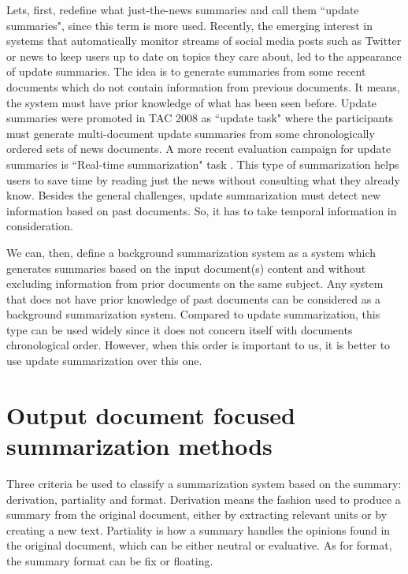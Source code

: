 Lets, first, redefine what just-the-news summaries and call them ``update summaries", since this term is more used. 
Recently, the emerging interest in systems that automatically monitor streams of social media posts such as Twitter or news to keep users up to date on topics they care about, led to the appearance of update summaries.
The idea is to generate summaries from some recent documents which do not contain information from previous documents. 
It means, the system must have prior knowledge of what has been seen before. 
Update summaries were promoted in TAC 2008 as ``update task" \citep{08-dang-owczarzak} where the participants must generate multi-document update summaries from some chronologically ordered sets of news documents.
A more recent evaluation campaign for update summaries is ``Real-time summarization" task \citep{17-lin-al}.
This type of summarization helps users to save time by reading just the news without consulting what they already know. 
Besides the general challenges, update summarization must detect new information based on past documents. 
So, it has to take temporal information in consideration. 

We can, then, define a background summarization system as a system which generates summaries based on the input document(s) content and without excluding information from prior documents on the same subject. 
Any system that does not have prior knowledge of past documents can be considered as a background summarization system. 
Compared to update summarization, this type can be used widely since it does not concern itself with documents chronological order.
However, when this order is important to us, it is better to use update summarization over this one.

\section{Output document focused summarization methods}

Three criteria be used to classify a summarization system based on the summary: derivation, partiality and format.
Derivation means the fashion used to produce a summary from the original document, either by extracting relevant units or by creating a new text.
Partiality is how a summary handles the opinions found in the original document, which can be either neutral or evaluative.
As for format, the summary format can be fix or floating.

